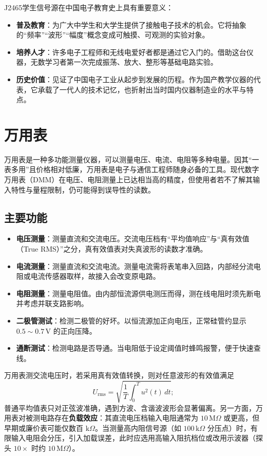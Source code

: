 J2465学生信号源在中国电子教育史上具有重要意义：

\begin{itemize}
    \item \textbf{普及教育}：为广大中学生和大学生提供了接触电子技术的机会。它将抽象的“频率”“波形”“幅度”概念变成可触摸、可观测的实验对象。
    \item \textbf{培养人才}：许多电子工程师和无线电爱好者都是通过它入门的。借助这台仪器，无数学习者第一次完成振荡、放大、整形等基础电路实验。
    \item \textbf{历史价值}：见证了中国电子工业从起步到发展的历程。作为国产教学仪器的代表，它承载了一代人的技术记忆，也折射出当时国内仪器制造业的水平与特点。
\end{itemize}

\section{万用表}
\label{sec:multimeter}

万用表是一种多功能测量仪器，可以测量电压、电流、电阻等多种电量。因其“一表多用”且价格相对低廉，万用表是电子与通信工程师随身必备的工具。现代数字万用表（DMM）在电压、电阻测量上已达相当高的精度，但使用者若不了解其输入特性与量程限制，仍可能得到误导性的读数。

\subsection{主要功能}

\begin{itemize}
    \item \textbf{电压测量}：测量直流和交流电压。交流电压档有“平均值响应”与“真有效值（True RMS）”之分，真有效值表对失真波形的读数才准确。
    \item \textbf{电流测量}：测量直流和交流电流。测量电流需将表笔串入回路，内部经分流电阻或电流传感器取样，故接入会改变原电路。
    \item \textbf{电阻测量}：测量电阻值。由内部恒流源供电测压而得，测在线电阻时须先断电并考虑并联支路影响。
    \item \textbf{二极管测试}：检测二极管的好坏。以恒流源加正向电压，正常硅管约显示 $0.5\sim0.7\,\mathrm{V}$ 的正向压降。
    \item \textbf{通断测试}：检测电路是否导通。当电阻低于设定阈值时蜂鸣报警，便于快速查线。
\end{itemize}

万用表测交流电压时，若采用真有效值转换，则对任意波形的有效值满足
\[
    U_{\mathrm{rms}} = \sqrt{ \frac{1}{T} \int_0^T u^2(t)\,dt } ;
\]
普通平均值表只对正弦波准确，遇到方波、含谐波波形会显著偏离。另一方面，万用表对被测电路存在\textbf{负载效应}：其直流电压档输入电阻通常为 $10\,\mathrm{M}\Omega$ 或更高，但早期或廉价表可能仅数百 $\mathrm{k}\Omega$。当测量高内阻信号源（如 $100\,\mathrm{k}\Omega$ 分压点）时，有限输入电阻会分压，引入加载误差，此时应选用高输入阻抗档位或改用示波器（探头 $10\times$ 时约 $10\,\mathrm{M}\Omega$）。

